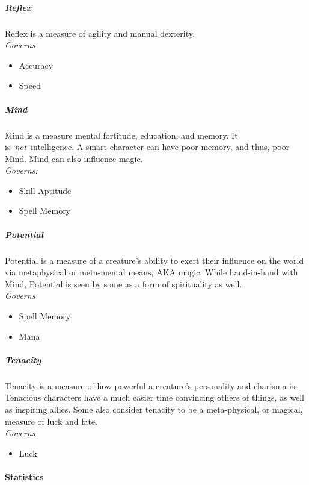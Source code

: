 \documentclass[
]{article}
\providecommand{\tightlist}{%
  \setlength{\itemsep}{0pt}\setlength{\parskip}{0pt}}
\begin{document}
\hypertarget{reflex}{%
\subparagraph{Reflex}\label{reflex}}

Reflex is a measure of agility and manual dexterity.\\
\emph{Governs}

\begin{itemize}
\tightlist
\item
  Accuracy
\item
  Speed
\end{itemize}

\hypertarget{mind}{%
\subparagraph{Mind}\label{mind}}

Mind is a measure mental fortitude, education, and memory. It
is~\emph{not}~intelligence. A smart character can have poor memory, and
thus, poor Mind. Mind can also influence magic.\\
\emph{Governs:}

\begin{itemize}
\tightlist
\item
  Skill Aptitude
\item
  Spell Memory
\end{itemize}

\hypertarget{potential}{%
\subparagraph{Potential}\label{potential}}

Potential is a measure of a creature's ability to exert their influence
on the world via metaphysical or meta-mental means, AKA magic. While
hand-in-hand with Mind, Potential is seen by some as a form of
spirituality as well.\\
\emph{Governs}

\begin{itemize}
\tightlist
\item
  Spell Memory
\item
  Mana
\end{itemize}

\hypertarget{tenacity}{%
\subparagraph{Tenacity}\label{tenacity}}

Tenacity is a measure of how powerful a creature's personality and
charisma is. Tenacious characters have a much easier time convincing
others of things, as well as inspiring allies. Some also consider
tenacity to be a meta-physical, or magical, measure of luck and fate.\\
\emph{Governs}

\begin{itemize}
\tightlist
\item
  Luck
\end{itemize}

\hypertarget{statistics}{%
\paragraph{Statistics}\label{statistics}}
\end{document}
